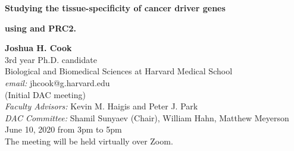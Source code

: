 \begin{titlepage}
    \begin{center}
        \vspace*{2cm}
        \LARGE
        \vspace{3cm}
        \textbf{Studying the tissue-specificity of cancer driver genes}
        
        \textbf{using \KRAS{} and PRC2.}

        \vspace{3cm}
 
        \normalsize
        \textbf{Joshua H. Cook} \\
        \vspace{0.75cm}
        3rd year Ph.D. candidate \\
        Biological and Biomedical Sciences at Harvard Medical School \\
        \emph{email:} jhcook@g.harvard.edu \\
        (Initial DAC meeting) \\
        \emph{Faculty Advisors:} Kevin M. Haigis and Peter J. Park \\
        \emph{DAC Committee:} Shamil Sunyaev (Chair), William Hahn, Matthew Meyerson \\
        June 10, 2020 from 3pm to 5pm \\
        The meeting will be held virtually over Zoom.\\
        \vspace{2cm}
 
    \end{center}
\end{titlepage}
